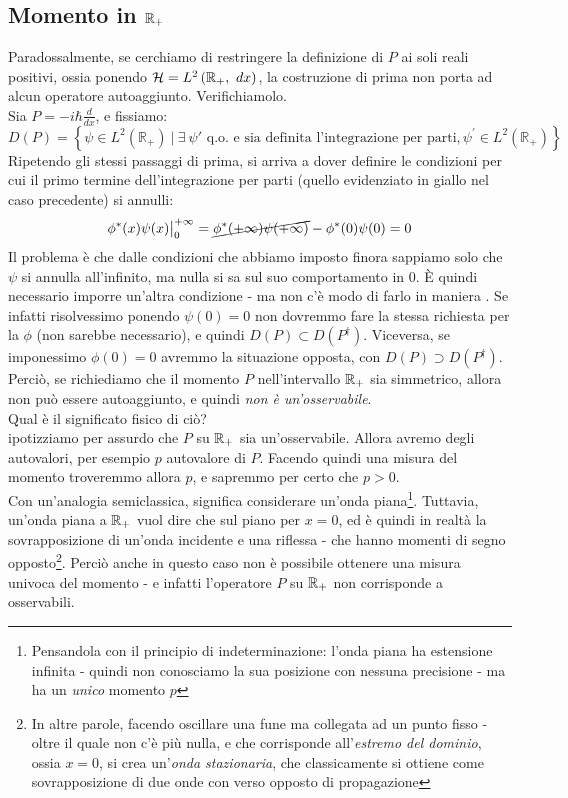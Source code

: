 \documentclass[../../FisicaTeorica.tex]{subfiles}
\begin{document}
\subsection{Momento in $\mathbb{R}_+$}
Paradossalmente, se cerchiamo di restringere la definizione di $P$ ai soli reali positivi, ossia ponendo $\mathcal{H}=L^2\left(\mathbb{R}_+,\ dx\right)$, la costruzione di prima non porta ad alcun operatore autoaggiunto. Verifichiamolo.\\
Sia $P= -i\hbar \frac{d}{dx}$, e fissiamo:
\[
D\left(P\right)= \left\{\psi\in L^2\left(\mathbb{R}_+\right)\ |\ \exists\> \psi'
\text{ q.o. e sia definita l'integrazione per parti}, \psi^\prime\in L^2(\mathbb{R}_+)\right\}
\]
Ripetendo gli stessi passaggi di prima, si arriva a dover definire le condizioni per cui il primo termine dell'integrazione per parti (quello evidenziato in giallo nel caso precedente) si annulli:
\[
\phi^*(x)\psi(x)\big|_{0}^{+\infty} = \cancel{\phi^*(+\infty)\psi(+\infty)} - \phi^*(0)\psi(0) = 0
\]
Il problema è che dalle condizioni che abbiamo imposto finora sappiamo solo che $\psi$ si annulla all'infinito, ma nulla si sa sul suo comportamento in $0$. È quindi necessario imporre un'altra condizione - ma non c'è modo di farlo in maniera . Se infatti risolvessimo ponendo $\psi(0) = 0$ non dovremmo fare la stessa richiesta per la $\phi$ (non sarebbe necessario), e quindi $D(P) \subset D(P^\dag)$. Viceversa, se imponessimo $\phi(0) = 0$ avremmo la situazione opposta, con $D(P) \supset D(P^\dag)$.\\
Perciò, se richiediamo che il momento $P$ nell'intervallo $\mathbb{R}_+$ sia simmetrico, allora non può essere autoaggiunto, e quindi \textit{non è un'osservabile}.\\
Qual è il significato fisico di ciò?\\
ipotizziamo per assurdo che $P$ su $\mathbb{R}_+$ sia un'osservabile. Allora avremo degli autovalori, per esempio $p$ autovalore di $P$. Facendo quindi una misura del momento troveremmo allora $p$, e sapremmo per certo che $p>0$.\\
Con un'analogia semiclassica,  significa considerare un'onda piana\footnote{Pensandola con il principio di indeterminazione: l'onda piana ha estensione infinita - quindi non conosciamo la sua posizione con nessuna precisione - ma ha un \textit{unico} momento $p$}. Tuttavia, un'onda piana  a $\mathbb{R}_+$ vuol dire che  sul piano per $x=0$, ed è quindi in realtà la sovrapposizione di un'onda incidente e una riflessa - che hanno momenti di segno opposto\footnote{In altre parole, facendo oscillare una fune  ma collegata ad un punto fisso - oltre il quale non c'è più nulla, e che corrisponde all'\textit{estremo del dominio}, ossia $x=0$, si crea un'\textit{onda stazionaria}, che classicamente si ottiene come sovrapposizione di due onde con verso opposto di propagazione}. Perciò anche in questo caso non è possibile ottenere una misura univoca del momento - e infatti l'operatore $P$ su $\mathbb{R}_+$ non corrisponde a osservabili.
\end{document}
